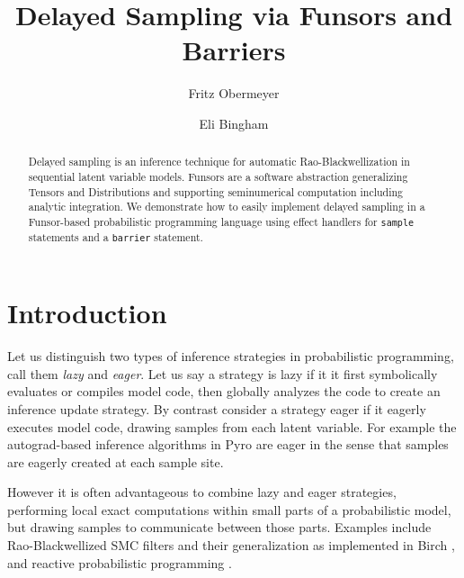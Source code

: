 \documentclass[anonymous=false, %
               format=acmsmall, %
               review=true, %
               screen=true, %
               nonacm=true]{acmart}
\begin{document}
\title{Delayed Sampling via Funsors and Barriers}

\author{Fritz Obermeyer}

\author{Eli Bingham}

\begin{abstract}
Delayed sampling is an inference technique for automatic Rao-Blackwellization in sequential latent variable models.
Funsors are a software abstraction generalizing Tensors and Distributions and supporting seminumerical computation including analytic integration.
We demonstrate how to easily implement delayed sampling in a Funsor-based probabilistic programming language using effect handlers for \texttt{sample} statements and a \texttt{barrier} statement.
\end{abstract}

\maketitle

\section{Introduction}

Let us distinguish two types of inference strategies in probabilistic programming, call them \emph{lazy} and \emph{eager}.
Let us say a strategy is lazy if it it first symbolically evaluates or compiles model code, then globally analyzes the code to create an inference update strategy.
By contrast consider a strategy eager if it eagerly executes model code, drawing samples from each latent variable.
For example the autograd-based inference algorithms in Pyro \cite{bingham2018pyro} are eager in the sense that samples are eagerly created at each sample site.

However it is often advantageous to combine lazy and eager strategies, performing local exact computations within small parts of a probabilistic model, but drawing samples to communicate between those parts.
Examples include Rao-Blackwellized SMC filters and their generalization as implemented in Birch \cite{murray2017delayed}, and reactive probabilistic programming \cite{baudart2019reactive}.
\end{document}
